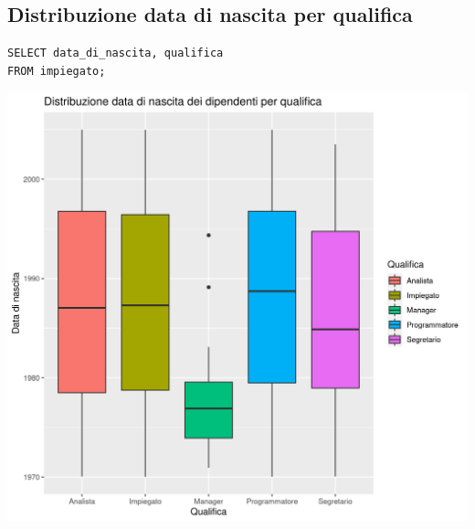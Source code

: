 \documentclass{article}
\begin{document}
\subsection{Distribuzione data di nascita per qualifica}
\begin{verbatim}
SELECT data_di_nascita, qualifica
FROM impiegato;
\end{verbatim}
\begin{center}
\includegraphics[width=\textwidth]{plot_dist_dNascita_qualifica.png}
\end{center}

\newpage
\end{document}
